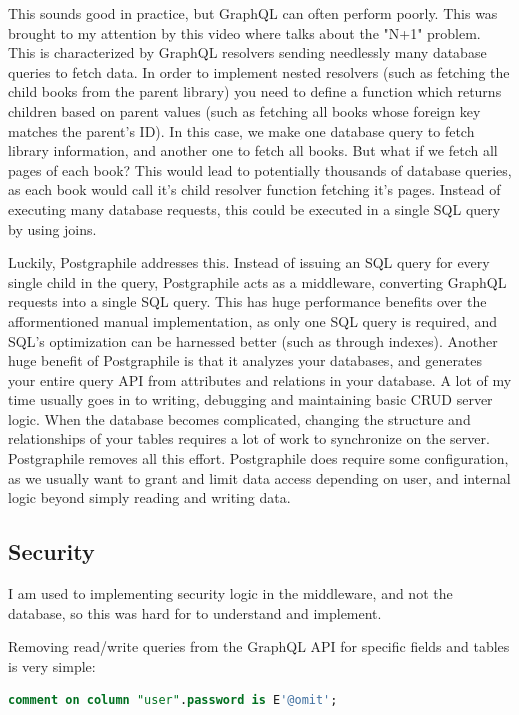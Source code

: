 \documentclass{l4proj}
\begin{document}
This sounds good in practice, but GraphQL can often perform poorly. This was brought to my attention by this video where \citet{Awad} talks about the "N+1" problem. This is characterized by GraphQL resolvers sending needlessly many database queries to fetch data. In order to implement nested resolvers (such as fetching the child books from the parent library) you need to define a function which returns children based on parent values (such as fetching all books whose foreign key matches the parent's ID). In this case, we make one database query to fetch library information, and another one to fetch all books. But what if we fetch all pages of each book? This would lead to potentially thousands of database queries, as each book would call it's child resolver function fetching it's pages. Instead of executing many database requests, this could be executed in a single SQL query by using joins.

Luckily, Postgraphile addresses this. Instead of issuing an SQL query for every single child in the query, Postgraphile acts as a middleware, converting GraphQL requests into a single SQL query. This has huge performance benefits over the afformentioned manual implementation, as only one SQL query is required, and SQL's optimization can be harnessed better (such as through indexes). Another huge benefit of Postgraphile is that it analyzes your databases, and generates your entire query API from attributes and relations in your database. A lot of my time usually goes in to writing, debugging and maintaining basic CRUD server logic. When the database becomes complicated, changing the structure and relationships of your tables requires a lot of work to synchronize on the server. Postgraphile removes all this effort. Postgraphile does require some configuration, as we usually want to grant and limit data access depending on user, and internal logic beyond simply reading and writing data. 


\subsection{Security}
I am used to implementing security logic in the middleware, and not the database, so this was hard for to understand and implement. 

Removing read/write queries from the GraphQL API for specific fields and tables is very simple:

\begin{lstlisting}[language=SQL, caption={This comment tells Postgraphile to omit password fields} ]
comment on column "user".password is E'@omit';
\end{lstlisting}
\end{document}
